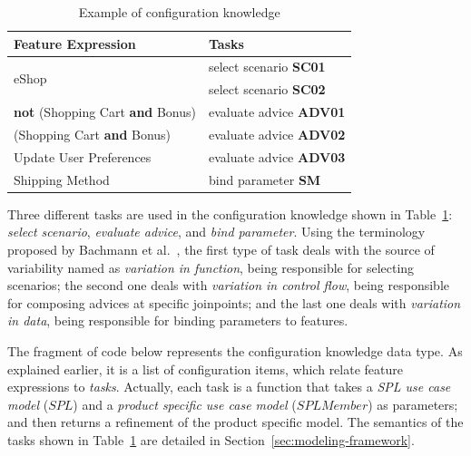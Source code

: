 \documentclass{acm_proc_article-sp}
\begin{document}
\begin{table}[htb]
\begin{small}
\begin{tabular}{|lp{1.4in}|}
\hline
Feature Expression  						& Tasks					 \\ \hline

\multirow{2}{*}{eShop}						& select scenario {\bf SC01} \\
											& select scenario {\bf SC02} \\	\hline
{\bf not} (Shopping Cart {\bf and} Bonus) 	& evaluate advice {\bf ADV01} \\
\hline (Shopping Cart {\bf and} Bonus) 		& evaluate advice {\bf ADV02} 	\\
\hline Update User Preferences 				& evaluate advice {\bf ADV03} \\ \hline
Shipping Method								& bind parameter {\bf SM}\\ \hline
								
\end{tabular}
\end{small}
\caption{Example of configuration knowledge}
\label{tab:eshop-ck}
\end{table}

{\color{red}Three different tasks are used in the configuration knowledge shown in
Table~\ref{tab:eshop-ck}: \emph{select scenario},
\emph{evaluate advice}, and \emph{bind parameter}. Using the terminology
proposed by Bachmann et al.~\cite{Bachmann:2001aa}, the first type of task deals with
the source of variability named as \emph{variation in function}, being responsible for selecting scenarios; the second one
deals with \emph{variation in control flow}, being responsible for composing advices at specific joinpoints; and the last one deals with \emph{variation in data}, being responsible for binding parameters to features.}

{\color{red}
The fragment of code below represents the
configuration knowledge data type. As explained earlier, it is 
a list of configuration items, which relate feature expressions to 
\emph{tasks}. Actually, each task is a function that takes a \emph{SPL use case model} ($SPL$) and 
a \emph{product specific use case model} ($SPLMember$) as parameters; and then returns a refinement of the product specific model. The semantics of the tasks shown in Table~\ref{tab:eshop-ck} are detailed in Section~\ref{sec:modeling-framework}.}
 
\end{document}
